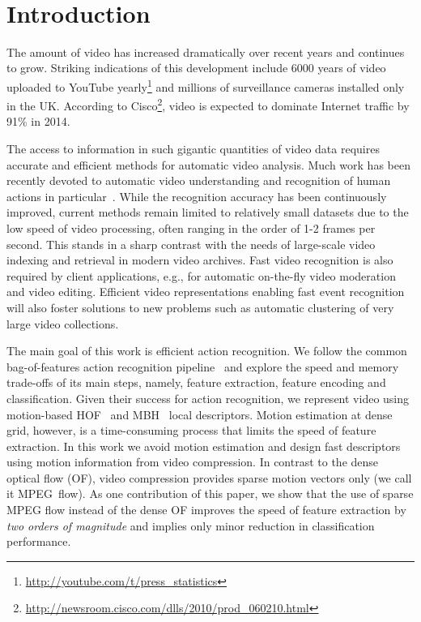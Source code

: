 \documentclass[10pt,twocolumn,letterpaper]{article}
\begin{document}

\mbox{}\vspace{-1.3cm}\\
\section{Introduction}

The amount of video has increased dramatically over recent years and continues to grow. Striking indications of this development
include 6000 years of video uploaded to YouTube
yearly\footnote{\scriptsize
\url{http://youtube.com/t/press\_statistics}} and millions of
surveillance cameras installed only in the UK. According to
Cisco\footnote{\scriptsize
\url{http://newsroom.cisco.com/dlls/2010/prod_060210.html}},
video is expected to dominate Internet traffic by 91\% in 2014.

The access to information in such gigantic quantities of video
data requires accurate and efficient methods for automatic video analysis. Much work has been recently devoted to automatic video understanding and recognition of human actions in
particular~\cite{Laptev08,Liu11,Niebles10,Sadanand12,Schuldt04,Wang12}.
While the recognition accuracy has been continuously improved,
current methods remain limited to relatively small datasets due
to the low speed of video processing, often ranging in the order of 1-2 frames per second. This stands in a sharp contrast with
the needs of large-scale video indexing and retrieval in modern
video archives. Fast video recognition is also required by
client applications, e.g., for automatic on-the-fly video
moderation and video editing. Efficient video representations
enabling fast event recognition will also foster solutions to
new problems such as automatic clustering of very large video
collections.

The main goal of this work is efficient action recognition. We
follow the common bag-of-features action recognition
pipeline~\cite{Laptev08,Schuldt04,Wang12} and explore the speed
and memory trade-offs of its main steps, namely, feature
extraction, feature encoding and classification. Given their
success for action recognition, we represent video
using motion-based HOF~\cite{Laptev08} and MBH~\cite{Wang12}
local descriptors. Motion estimation at dense grid, however, is
a time-consuming process that
limits the speed of feature extraction.
In this work we avoid motion estimation and design
fast
descriptors using motion information from video compression.
In contrast to the dense optical flow (OF), video compression
provides sparse motion vectors only (we call it MPEG~flow).
As one contribution of this paper, we show that the use of
sparse MPEG flow instead of the dense OF improves the speed of
feature extraction by {\em two orders of magnitude} and implies
only minor reduction in classification performance.
\end{document}

